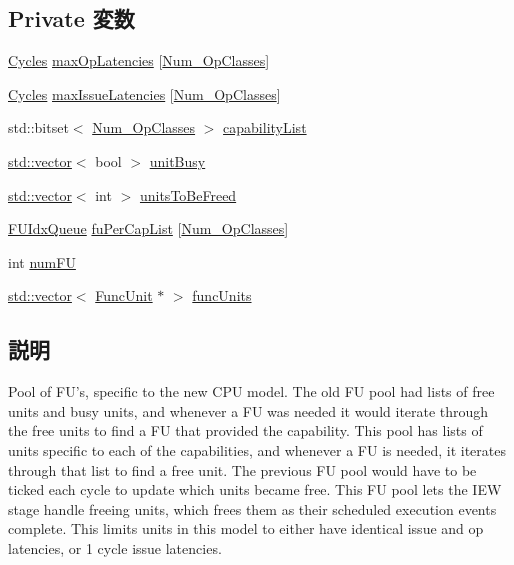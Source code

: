 \subsection*{Private 変数}
\begin{DoxyCompactItemize}
\item 
\hyperlink{classCycles}{Cycles} \hyperlink{classFUPool_ac999d6f818bb8f54b6519e85a5369e25}{maxOpLatencies} \mbox{[}\hyperlink{op__class_8hh_a5e0e351c8afca390ef0a05a7dbb68b1b}{Num\_\-OpClasses}\mbox{]}
\item 
\hyperlink{classCycles}{Cycles} \hyperlink{classFUPool_ae3464c4dc458673d68839affdb919eeb}{maxIssueLatencies} \mbox{[}\hyperlink{op__class_8hh_a5e0e351c8afca390ef0a05a7dbb68b1b}{Num\_\-OpClasses}\mbox{]}
\item 
std::bitset$<$ \hyperlink{op__class_8hh_a5e0e351c8afca390ef0a05a7dbb68b1b}{Num\_\-OpClasses} $>$ \hyperlink{classFUPool_a7539c2a37351472e37845fdde96e3d37}{capabilityList}
\item 
\hyperlink{classstd_1_1vector}{std::vector}$<$ bool $>$ \hyperlink{classFUPool_a3161f36ae7f93643b75fc37c7a1b0e23}{unitBusy}
\item 
\hyperlink{classstd_1_1vector}{std::vector}$<$ int $>$ \hyperlink{classFUPool_aa2972d7a97b76cc15ec7bbd38e5c9da5}{unitsToBeFreed}
\item 
\hyperlink{classFUPool_1_1FUIdxQueue}{FUIdxQueue} \hyperlink{classFUPool_a50bef5b8a540cb33884057b9771c4c44}{fuPerCapList} \mbox{[}\hyperlink{op__class_8hh_a5e0e351c8afca390ef0a05a7dbb68b1b}{Num\_\-OpClasses}\mbox{]}
\item 
int \hyperlink{classFUPool_ae0b3cf4db09e8c26c2ab03dbe18bfb19}{numFU}
\item 
\hyperlink{classstd_1_1vector}{std::vector}$<$ \hyperlink{classFuncUnit}{FuncUnit} $\ast$ $>$ \hyperlink{classFUPool_a65261caecadb9b5cbf48625e3c64330d}{funcUnits}
\end{DoxyCompactItemize}


\subsection{説明}
Pool of FU's, specific to the new CPU model. The old FU pool had lists of free units and busy units, and whenever a FU was needed it would iterate through the free units to find a FU that provided the capability. This pool has lists of units specific to each of the capabilities, and whenever a FU is needed, it iterates through that list to find a free unit. The previous FU pool would have to be ticked each cycle to update which units became free. This FU pool lets the IEW stage handle freeing units, which frees them as their scheduled execution events complete. This limits units in this model to either have identical issue and op latencies, or 1 cycle issue latencies. 

